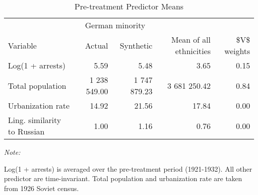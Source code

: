 \begin{table}[!h]

\caption{\label{tab:sc_predictor_means_robustness}Pre-treatment Predictor Means}
\centering
\begin{threeparttable}
\fontsize{10}{12}\selectfont
\begin{tabular}{lrrrr}
\toprule
\multicolumn{1}{c}{ } & \multicolumn{2}{c}{German minority} \\
\cmidrule(l{2pt}r{2pt}){2-3}
Variable & Actual & Synthetic & Mean of all ethnicities & \$V\$ weights\\
\midrule
Log(1 + arrests) & 5.59 & 5.48 & 3.65 & 0.15\\
Total population & 1 238 549.00 & 1 747 879.23 & 3 681 250.42 & 0.84\\
Urbanization rate & 14.92 & 21.56 & 17.84 & 0.00\\
Ling. similarity to Russian & 1.00 & 1.16 & 0.76 & 0.00\\
\bottomrule
\end{tabular}
\begin{tablenotes}
\item \textit{Note: } 
\item Log(1 + arrests) is averaged over the pre-treatment period (1921-1932). All other predictor are time-invariant. Total population and urbanization rate are taken from 1926 Soviet census.
\end{tablenotes}
\end{threeparttable}
\end{table}